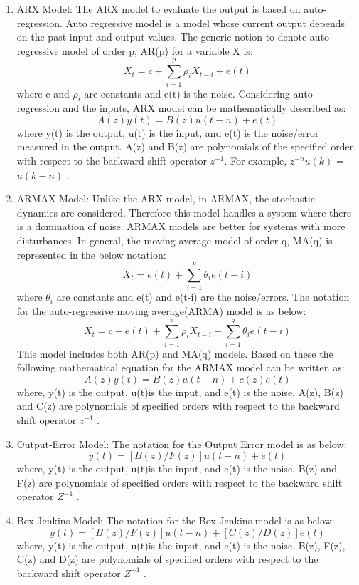 \documentclass[article,type=msc,colorback,12pt,accentcolor=tud8b,table]{tudthesis}
\begin{document}
	\begin{enumerate}
		\item{ARX Model:} The ARX model to evaluate the output is based on auto-regression. Auto regressive model is a model whose current output depends on the past input and output values. The generic notion to denote auto-regressive model of order p, AR(p) for a variable X is: $$ X_t = c + \sum_{i=1}^{p} \rho_i X_{t-i} + e(t) $$ where c and $ \rho_i $ are constants and e(t) is the noise. Considering auto regression and the inputs, ARX model can be mathematically described as: $$ A(z) y(t) = B(z) u(t-n) + e(t) $$ where y(t) is the output, u(t) is the input, and e(t) is the noise/error measured in the output. A(z) and B(z) are polynomials of the specified order with respect to the backward shift operator $z^{-1}$. For example, $z^{-n}  u(k)$ = $u(k-n)$ \cite{ljung1999system}.
		
	\item{ARMAX Model:} Unlike the ARX model, in ARMAX, the stochastic dynamics are considered. Therefore this model handles a system where there is a domination of noise. ARMAX models are better for systems with more disturbances. In general, the moving average model of order q, MA(q) is represented in the below notation: $$ X_t =  e(t) + \sum_{i=1}^{q} \theta_i e(t-i) $$ where $ \theta_i $ are constants and e(t) and e(t-i) are the noise/errors. The notation for the auto-regressive moving average(ARMA) model is as below: $$ X_t = c + e(t) + \sum_{i=1}^{p} \rho_i X_{t-i} + \sum_{i=1}^{q} \theta_i e(t-i) $$ This model includes both AR(p) and MA(q) models. Based on these the following mathematical equation for the ARMAX model can be written as: $$ A(z) y(t) = B(z) u(t-n) + c(z) e(t) $$ where, y(t) is the output, u(t)is the input, and e(t) is the noise. A(z), B(z) and C(z) are polynomials of specified orders with respect to the backward shift operator $z^{-1}$ \cite{ljung1999system}. 
	
	\item{Output-Error Model:} 
		The notation for the Output Error model is as below: $$ y(t) = [B(z)/F(z)] u(t-n) + e(t) $$ where, y(t) is the output, u(t)is the input, and e(t) is the noise. B(z) and F(z) are polynomials of specified orders with respect to the backward shift operator $Z^{-1}$ \cite{ljung1999system}.
	
	\item{Box-Jenkins Model:} 	
		 The notation for the Box Jenkins model is as below: $$ y(t) = [B(z)/F(z)] u(t-n) + [C(z)/D(z)] e(t) $$ where, y(t) is the output, u(t)is the input, and e(t) is the noise. B(z), F(z), C(z) and D(z) are polynomials of specified orders with respect to the backward shift operator $Z^{-1}$ \cite{box2015time}.	 
		 
	\end{enumerate}
	
\end{document}

